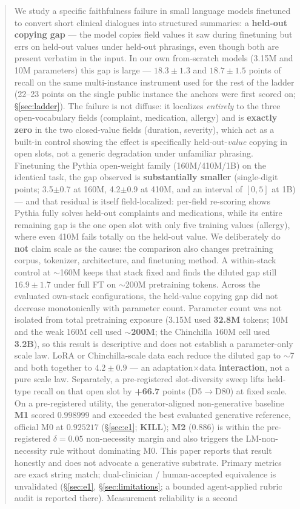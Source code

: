 \documentclass[11pt]{article}
\begin{document}
\begin{abstract}
We study a specific faithfulness failure in small language models finetuned to convert short clinical dialogues into structured summaries: a \textbf{held-out copying gap} --- the model copies field values it saw during finetuning but errs on held-out values under held-out phrasings, even though both are present verbatim in the input. In our own from-scratch models (3.15M and 10M parameters) this gap is large --- $18.3\pm1.3$ and $18.7\pm1.5$ points of recall on the same multi-instance instrument used for the rest of the ladder (22--23 points on the single public instance the anchors were first scored on; \S\ref{sec:ladder}). The failure is not diffuse: it localizes \emph{entirely} to the three open-vocabulary fields (complaint, medication, allergy) and is \textbf{exactly zero} in the two closed-value fields (duration, severity), which act as a built-in control showing the effect is specifically held-out-\emph{value} copying in open slots, not a generic degradation under unfamiliar phrasing. Finetuning the Pythia open-weight family (160M/410M/1B) on the identical task, the gap observed is \textbf{substantially smaller} (single-digit points; 3.5$\pm$0.7 at 160M, 4.2$\pm$0.9 at 410M, and an interval of $[0,5]$ at 1B) --- and that residual is itself field-localized: per-field re-scoring shows Pythia fully solves held-out complaints and medications, while its entire remaining gap is the one open slot with only five training values (allergy), where even 410M fails totally on the held-out value. We deliberately do \textbf{not} claim scale as the cause: the comparison also changes pretraining corpus, tokenizer, architecture, and finetuning method. A within-stack control at $\sim$160M keeps that stack fixed and finds the diluted gap still $16.9\pm1.7$ under full FT on $\sim$200M pretraining tokens. Across the evaluated own-stack configurations, the held-value copying gap did not decrease monotonically with parameter count. Parameter count was not isolated from total pretraining exposure (3.15M used \textbf{32.8M} tokens; 10M and the weak 160M cell used $\sim$\textbf{200M}; the Chinchilla 160M cell used \textbf{3.2B}), so this result is descriptive and does not establish a parameter-only scale law. LoRA or Chinchilla-scale data each reduce the diluted gap to $\sim$7 and both together to $4.2\pm0.9$ --- an adaptation$\times$data \textbf{interaction}, not a pure scale law. Separately, a pre-registered slot-diversity sweep lifts held-type recall on that open slot by \textbf{+66.7} points (D5$\rightarrow$D80) at fixed scale. On a pre-registered utility, the generator-aligned non-generative baseline \textbf{M1} scored $0.998999$ and exceeded the best evaluated generative reference, official M0 at $0.925217$ (\S\ref{sec:e1}; \textbf{KILL}); \textbf{M2} ($0.886$) is within the pre-registered $\delta=0.05$ non-necessity margin and also triggers the LM-non-necessity rule without dominating M0. This paper reports that result honestly and does not advocate a generative substrate. Primary metrics are exact string match; dual-clinician / human-accepted equivalence is unvalidated (\S\ref{sec:e1}, \S\ref{sec:limitations}; a bounded agent-applied rubric audit is reported there). Measurement reliability is a second 
\end{abstract}
\end{document}
